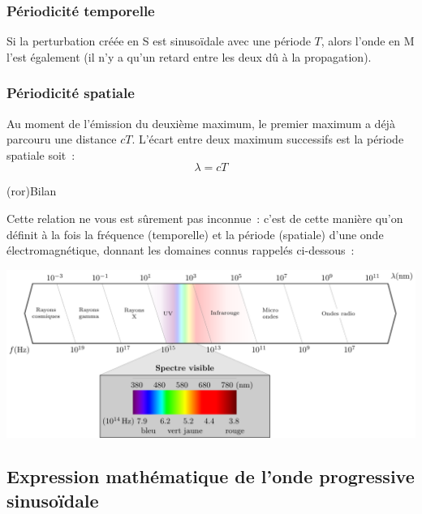 \documentclass[../../main/main.tex]{subfiles}
\begin{document}
\subsubsection{Périodicité temporelle}
Si la perturbation créée en S est sinusoïdale avec une période $T$, alors l'onde
en M l'est également (il n'y a qu'un retard entre les deux dû à la propagation).

\subsubsection{Périodicité spatiale}

Au moment de l'émission du deuxième maximum, le premier maximum a déjà parcouru
une distance $cT$. L'écart entre deux maximum successifs est la période spatiale
soit~:
\[\lambda = cT\]

\begin{tcb}(ror){Bilan}
\end{tcb}

Cette relation ne vous est sûrement pas inconnue~: c'est de cette manière qu'on
définit à la fois la fréquence (temporelle) et la période (spatiale) d'une onde
électromagnétique, donnant les domaines connus rappelés ci-dessous~:

\begin{center}
	\includegraphics[width=\linewidth]{full_spectre}
\end{center}

\subsection{Expression mathématique de l'onde progressive sinusoïdale}
\end{document}
